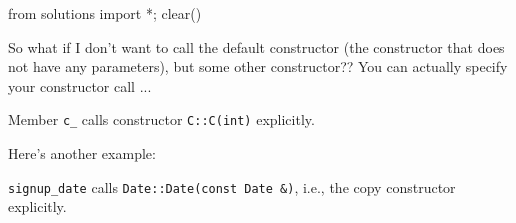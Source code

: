 \begin{python0}
from solutions import *; clear()
\end{python0}

So what if I don't want to call the default constructor (the constructor that does not have any parameters), but some other constructor?? You can actually specify your constructor call ...


Member \texttt{c\_} calls constructor \texttt{C::C(int)} explicitly.

Here's another example:


\verb!signup_date! calls \verb!Date::Date(const Date &)!, i.e., the
copy constructor explicitly.

